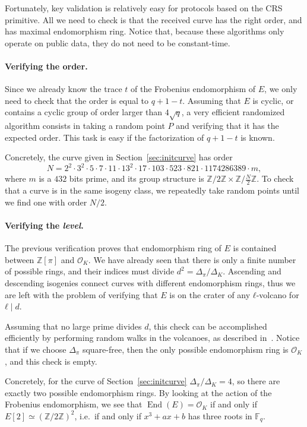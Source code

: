 \documentclass{article}
\newcommand{\F}{\mathbb{F}}
\renewcommand{\O}{\mathcal{O}}
\theoremstyle{definition}
\DeclareMathOperator{\End}{End}
\begin{document}
Fortunately, key validation is relatively easy for protocols based on
the CRS primitive. All we need to check is that the received curve has
the right order, and has maximal endomorphism ring. Notice that,
because these algorithms only operate on public data, they do not need
to be constant-time.

\paragraph{Verifying the order.} Since we already know the trace $t$
of the Frobenius endomorphism of $E$, we only need to check that the
order is equal to $q+1-t$. Assuming that $E$ is cyclic, or contains a
cyclic group of order larger than $4\sqrt{q}$, a very efficient
randomized algorithm consists in taking a random point $P$ and
verifying that it has the expected order.  This task is easy if the
factorization of $q+1-t$ is known.

Concretely, the curve given in Section~\ref{sec:initcurve} has order
\[N = 2^2 · 3^2 · 5 · 7 · 11 · 13^2 · 17 · 103 · 523 · 821 ·
  1174286389 · m,\] %
where $m$ is a $432$ bits prime, and its group structure is
$ℤ/2ℤ×ℤ/\frac{N}{2}ℤ$. To check that a curve is in the same isogeny
class, we repeatedly take random points until we find one with order
$N/2$.

\paragraph{Verifying the \emph{level}.} The previous verification
proves that endomorphism ring of $E$ is contained between $ℤ[π]$ and
$\O_K$. We have already seen that there is only a finite number of
possible rings, and their indices must divide $d^2=Δ_π/Δ_K$. Ascending
and descending isogenies connect curves with different endomorphism
rings, thus we are left with the problem of verifying that $E$ is on
the crater of any $ℓ$-volcano for $ℓ\mid d$.

Assuming that no large prime divides $d$, this check can be
accomplished efficiently by performing random walks in the volcanoes,
as described in~\cite{fouquet+morain02}. Notice that if we choose
$Δ_π$ square-free, then the only possible endomorphism ring is $\O_K$,
and this check is empty.

Concretely, for the curve of Section~\ref{sec:initcurve} $Δ_π/Δ_K=4$,
so there are exactly two possible endomorphism rings. By looking at
the action of the Frobenius endomorphism, we see that $\End(E)=\O_K$
if and only if $E[2]≃(ℤ/2ℤ)^2$, i.e.\ if and only if $x^3+ax+b$ has
three roots in $\F_q$.
\end{document}
